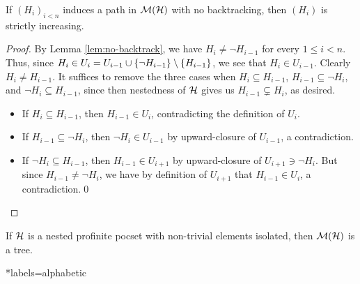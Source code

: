 \documentclass{amsart}
\begin{document}
\begin{appendices}
        \begin{proposition}\label{prp:strictly-inc}
            If $(H_i)_{i<n}$ induces a path in $\mathcal{M}(\mathcal{H})$ with no backtracking, then $(H_i)$ is strictly increasing.
        \end{proposition}
        \begin{proof}
            By Lemma \ref{lem:no-backtrack}, we have $H_i\neq\lnot H_{i-1}$ for every $1\leq i<n$. Thus, since $H_i\in U_i=U_{i-1}\cup\{\lnot H_{i-1}\}\setminus\left\{H_{i-1}\right\}$, we see that $H_i\in U_{i-1}$. Clearly $H_i\neq H_{i-1}$. It suffices to remove the three cases when $H_i\subseteq H_{i-1}$, $H_{i-1}\subseteq\lnot H_i$, and $\lnot H_i\subseteq H_{i-1}$, since then nestedness of $\mathcal{H}$ gives us $H_{i-1}\subsetneq H_i$, as desired.
            \begin{itemize}
                \item If $H_i\subseteq H_{i-1}$, then $H_{i-1}\in U_i$, contradicting the definition of $U_i$.
                \item If $H_{i-1}\subseteq\lnot H_i$, then $\lnot H_i\in U_{i-1}$ by upward-closure of $U_{i-1}$, a contradiction.
                \item If $\lnot H_i\subseteq H_{i-1}$, then $H_{i-1}\in U_{i+1}$ by upward-closure of $U_{i+1}\ni\lnot H_i$. But since $H_{i-1}\neq\lnot H_i$, we have by definition of $U_{i+1}$ that $H_{i-1}\in U_i$, a contradiction.\qed
            \end{itemize}
        \end{proof}

        \begin{corollary}
            If $\mathcal{H}$ is a nested profinite pocset with non-trivial elements isolated, then $\mathcal{M}(\mathcal{H})$ is a tree.
        \end{corollary}
    \end{appendices}

    \begin{bibdiv}
        \begin{biblist}*{labels={alphabetic}}
        \end{biblist}
    \end{bibdiv}
\end{document}
